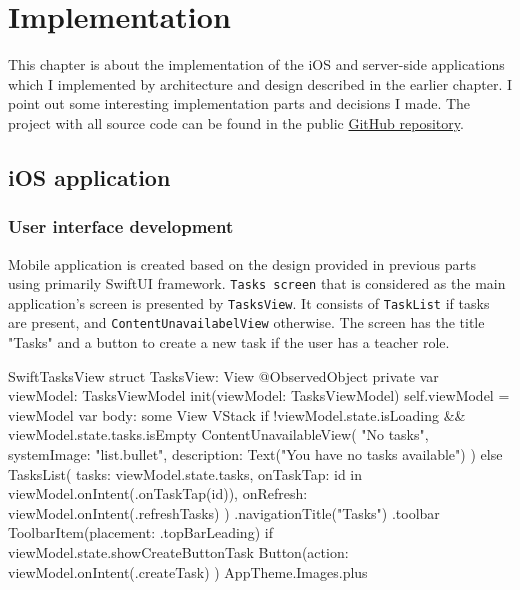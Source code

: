 \documentclass[
  biblatex,
  language=english,
  figures=false,
  sourcecodes,
  glossaries,
  index
]{kidiplom}
\begin{document}
\section{Implementation}
This chapter is about the implementation of the iOS and server-side applications which I implemented by architecture and design described in the earlier chapter. I point out some interesting implementation parts and decisions I made. The project with all source code can be found in the public \href{https://github.com/maxkup19/bachelor-thesis}{GitHub repository}.

\subsection{iOS application}
\subsubsection{User interface development}
Mobile application is created based on the design provided in previous parts using primarily SwiftUI framework. \texttt{Tasks screen} that is considered as the main application's screen is presented by \texttt{TasksView}. It consists of \texttt{TaskList} if tasks are present, and \texttt{ContentUnavailabelView} otherwise. The screen has the title "Tasks" and a button to create a new task if the user has a teacher role.

\begin{kicode}{Swift}{}{TasksView}
struct TasksView: View {
    @ObservedObject private var viewModel: TasksViewModel
    init(viewModel: TasksViewModel) {
        self.viewModel = viewModel
    }
    var body: some View {
        VStack {
            if !viewModel.state.isLoading && viewModel.state.tasks.isEmpty {
                ContentUnavailableView(
                    "No tasks",
                    systemImage: "list.bullet",
                    description: Text("You have no tasks available")
                )
            } else {
                TasksList(
                    tasks: viewModel.state.tasks,
                    onTaskTap: { id in viewModel.onIntent(.onTaskTap(id))},
                    onRefresh: { viewModel.onIntent(.refreshTasks) }
                )
            }
        }
        .navigationTitle("Tasks")
        .toolbar {
            ToolbarItem(placement: .topBarLeading) {
                if viewModel.state.showCreateButtonTask {
                    Button(action: { viewModel.onIntent(.createTask) }) {
                        AppTheme.Images.plus
                    }
                }
            }
        }
    }
}
\end{kicode}
\end{document}
